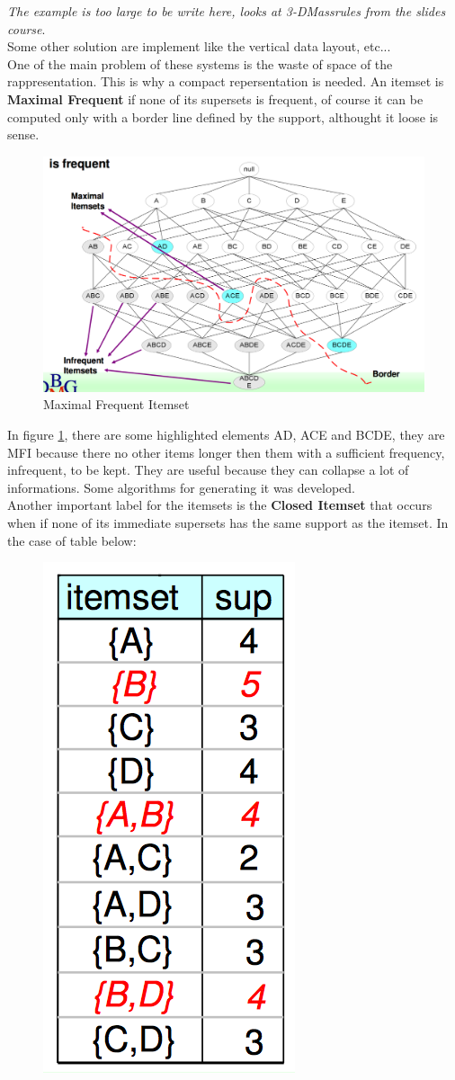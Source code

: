 \documentclass[12pt]{article}
\begin{document}
\textit{The example is too large to be write here, looks at 3-DMassrules from the slides course}.\\
Some other solution are implement like the vertical data layout, etc...\\

One of the main problem of these systems is the waste of space of the rappresentation. This is why a compact repersentation is needed.
An itemset is \textbf{Maximal Frequent} if none of its supersets is frequent, of course it can be computed only with a border line defined by the support, althought it loose is sense.
\begin{figure}[h!]
  \includegraphics[width=\linewidth]{images/MFI.png}
  \caption{Maximal Frequent Itemset}
  \label{fig:MFI}
\end{figure}
In figure \ref{fig:MFI}, there are some highlighted elements AD, ACE and BCDE, they are MFI because there no other items longer then them with a sufficient frequency, infrequent, to be kept. They are useful because they can collapse a lot of informations. Some algorithms for generating it was developed.\\
Another important label for the itemsets is the \textbf{Closed Itemset} that occurs when if none of its immediate supersets has the same support as the itemset. In the case of table below:
\begin{figure}[H]
  \centering
  \includegraphics[width=0.2\linewidth]{images/CI.png}
  \label{fig:CI}
\end{figure}
\end{document}
